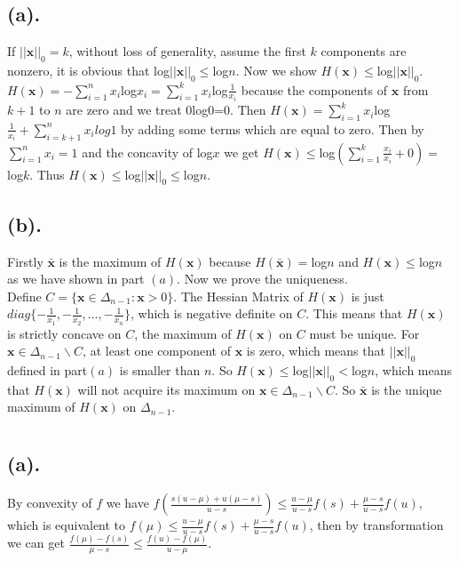 \documentclass[12pt,letterpaper]{article}
\begin{document}
\section{}
\subsection*{(a).}
If $||\boldsymbol{x}||_0=k$, without loss of generality, assume the first $k$ components are nonzero, it is obvious that log$||\boldsymbol{x}||_0\leq$log$n$. Now we show $H(\boldsymbol{x})\leq$log$||\boldsymbol{x}||_0$.\\
$H(\boldsymbol{x})=-\sum_{i=1}^{n}x_i$log$x_i=\sum_{i=1}^{k}x_i$log$\frac{1}{x_i}$ because the components of $\boldsymbol{x}$ from $k+1$ to $n$ are zero and we treat 0log0=0. Then $H(\boldsymbol{x})=\sum_{i=1}^{k}x_i$log$\frac{1}{x_i}+\sum_{i=k+1}^{n}x_ilog1$ by adding some terms which are equal to zero. Then by $\sum_{i=1}^{n}x_i=1$ and the concavity of log$x$ we get $H(\boldsymbol{x})\leq$log$(\sum_{i=1}^{k}\frac{x_i}{x_i}+0)=$log$k$. Thus $H(\boldsymbol{x})\leq$log$||\boldsymbol{x}||_0\leq$log$n$.
\subsection*{(b).}
Firstly $\bar{\boldsymbol{x}}$ is the maximum of $H(\boldsymbol{x})$ because $H(\bar{\boldsymbol{x}})=$log$n$ and $H(\boldsymbol{x})\leq$log$n$ as we have shown in part $(a)$. Now we prove the uniqueness.\\
Define $C=\{\boldsymbol{x}\in\Delta_{n-1}:\boldsymbol{x}>0\}$. The Hessian Matrix of $H(\boldsymbol{x})$ is just $diag\{-\frac{1}{x_1},-\frac{1}{x_2},\dots,-\frac{1}{x_n}\}$, which is negative definite on $C$. This means that $H(\boldsymbol{x})$ is strictly concave on $C$, the maximum of $H(\boldsymbol{x})$ on $C$ must be unique. For $\boldsymbol{x}\in \Delta_{n-1}\backslash C$, at least one component of $\boldsymbol{x}$ is zero, which means that $||\boldsymbol{x}||_0$ defined in part$(a)$ is smaller than $n$. So $H(\boldsymbol{x})\leq$log$||\boldsymbol{x}||_0<$log$n$, which means that $H(\boldsymbol{x})$ will not acquire its maximum on $\boldsymbol{x}\in \Delta_{n-1}\backslash C$. So $\bar{\boldsymbol{x}}$ is the unique maximum of $H(\boldsymbol{x})$ on $\Delta_{n-1}$.
\section{}
\subsection*{(a).}
By convexity of $f$ we have $f(\frac{s(u-\mu)+u(\mu-s)}{u-s})\leq\frac{u-\mu}{u-s}f(s)+\frac{\mu-s}{u-s}f(u)$, which is equivalent to $f(\mu)\leq\frac{u-\mu}{u-s}f(s)+\frac{\mu-s}{u-s}f(u)$, then by transformation we can get $\frac{f(\mu)-f(s)}{\mu-s}\leq\frac{f(u)-f(\mu)}{u-\mu}$.
\end{document}
